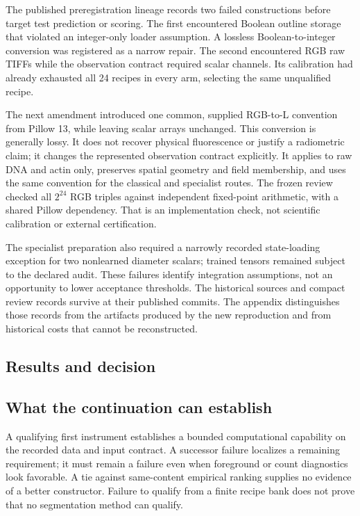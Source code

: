 The published preregistration lineage records two failed constructions before target test prediction or scoring. The first encountered Boolean outline storage that violated an integer-only loader assumption. A lossless Boolean-to-integer conversion was registered as a narrow repair. The second encountered RGB raw TIFFs while the observation contract required scalar channels. Its calibration had already exhausted all 24 recipes in every arm, selecting the same unqualified recipe.

The next amendment introduced one common, supplied RGB-to-L convention from Pillow 13, while leaving scalar arrays unchanged. This conversion is generally lossy. It does not recover physical fluorescence or justify a radiometric claim; it changes the represented observation contract explicitly. It applies to raw DNA and actin only, preserves spatial geometry and field membership, and uses the same convention for the classical and specialist routes. The frozen review checked all $2^{24}$ RGB triples against independent fixed-point arithmetic, with a shared Pillow dependency. That is an implementation check, not scientific calibration or external certification.

The specialist preparation also required a narrowly recorded state-loading exception for two nonlearned diameter scalars; trained tensors remained subject to the declared audit. These failures identify integration assumptions, not an opportunity to lower acceptance thresholds. The historical sources and compact review records survive at their published commits. The appendix distinguishes those records from the artifacts produced by the new reproduction and from historical costs that cannot be reconstructed.

\subsection{Results and decision}


\subsection{What the continuation can establish}

A qualifying first instrument establishes a bounded computational capability on the recorded data and input contract. A successor failure localizes a remaining requirement; it must remain a failure even when foreground or count diagnostics look favorable. A tie against same-content empirical ranking supplies no evidence of a better constructor. Failure to qualify from a finite recipe bank does not prove that no segmentation method can qualify.

